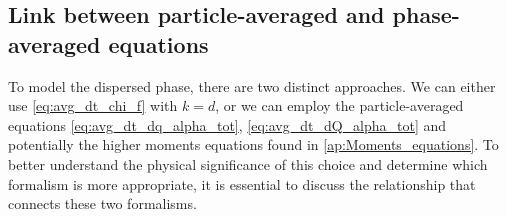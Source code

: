 
\subsection{Link between particle-averaged and phase-averaged equations}
\label{sec:equivalence}
To model the dispersed phase, there are two distinct approaches. 
We can either use \ref{eq:avg_dt_chi_f} with $k=d$, or we can employ the particle-averaged equations \ref{eq:avg_dt_dq_alpha_tot}, \ref{eq:avg_dt_dQ_alpha_tot} and potentially the higher moments equations found in \ref{ap:Moments_equations}.
To better understand the physical significance of this choice and determine which formalism is more appropriate, it is essential to discuss the relationship that connects these two formalisms. 


